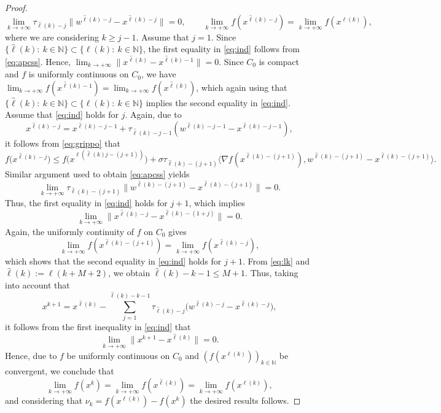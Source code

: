 \begin{proof}
	\begin{equation}\label{eq:ind}
		\lim_{k\to +\infty}  \tau_{{\hat \ell}(k)-j}\|w^{{{\hat \ell}(k)}-j}-x^{{{\hat \ell}(k)}-j}\|=0, \qquad \lim_{k\to +\infty} f(x^{{\hat \ell}(k)-j})= \lim_{k\to +\infty} f(x^{\ell(k)}),
	\end{equation}
	where we are  considering $k\geq j-1$. Assume that $j=1$. Since  $\{{\hat \ell}(k): ~k\in\mathbb{N}\}\subset \{{\ell}(k): ~k\in\mathbb{N}\}$, the first equality in \eqref{eq:ind} follows from \eqref{eq:apcss}. Hence, $\lim_{k\to +\infty} \|x^{{{\hat \ell}(k)}}-x^{{\hat \ell(k)}-1}\|=0$. Since  $C_{0}$ is  compact and  $f$ is uniformly continuous on $C_{0}$, we have $  \lim_{k\to +\infty} f(x^{{\hat \ell}(k)-1})=\lim_{k\to +\infty} f(x^{{\hat \ell(k)}})$, which again using that $\{{\hat \ell}(k): ~k\in\mathbb{N}\}\subset \{{\ell}(k): ~k\in\mathbb{N}\}$ implies the second equality in \eqref{eq:ind}. Assume that \eqref{eq:ind} holds for $j$. Again, due to
	$$x^{{{\hat \ell}(k)}-j}=x^{{{{\hat \ell}(k)}-j}-1}+ \tau_{{{{\hat \ell}(k)}-j}-1} (w^{{{{\hat \ell}(k)}-j}-1} - x^{{{{\hat \ell}(k)}-j} -1}),$$
	it follows from \eqref{eq:grippo} that
	$$
		f\big(x^{{{\hat \ell}(k)}-j}\big)  \leq f\big(x^{\ell({{{{\hat \ell}(k)}j}-(j+1)})}\big)+ \sigma \tau_{{{{\hat \ell}(k)}}-(j+1)}\big\langle \nabla f(x^{{{{\hat \ell}(k)}}-(j+1)}), w^{{{{\hat \ell}(k)}}-(j+1)} - x^{{{{\hat \ell}(k)}}-(j+1)} \big\rangle.
	$$
	Similar argument used to obtain \eqref{eq:apcss} yields
	$$
		\lim_{k\to +\infty} \tau_{{{{\hat \ell}(k)}}-(j+1)}\|w^{{{{\hat \ell}(k)}}-(j+1)}-x^{{{{\hat \ell}(k)}}-(j+1)}\|=0.
	$$
	Thus,  the first equality in \eqref{eq:ind} holds for $j+1$, which  implies
	$$
		\lim_{k\to +\infty} \|x^{{{\hat \ell}(k)}-j}-x^{{{{\hat \ell}(k)}}-(1+j)}\|=0.
	$$
	Again, the   uniformly continuity of $f$ on $C_{0}$ gives
	$$
		\lim_{k\to +\infty} f(x^{{\hat \ell}(k)-(j+1)})=\lim_{k\to +\infty} f(x^{{\hat \ell}(k)-j}),
	$$
	which shows that the second equality in \eqref{eq:ind} holds for $j+1$. From  \eqref{eq:lk}  and ${\hat \ell}(k):=\ell(k+M+2)$, we obtain ${\hat \ell}(k)-k-1\leq M+1$. Thus,  taking into account that
	$$
		x^{k+1}=x^{{\hat \ell}(k)}- \sum_{j=1}^{{\hat \ell}(k)-k-1} \tau_{{\hat \ell}(k)-j} \big(w^{{\hat \ell}(k)-j} - x^{{\hat \ell}(k)-j}\big),
	$$
	it follows from the first inequality in \eqref{eq:ind} that
	$$
		\lim_{k\to +\infty} \|x^{k+1}-x^{{\hat \ell}(k)}\|=0.
	$$
	Hence, due to  $f$ be uniformly continuous on $C_{0}$ and $(f(x^{\ell(k)}))_{k\in\mathbb{N}}$  be convergent,  we conclude that
	$$ \lim_{k\to +\infty} f(x^{k})=\lim_{k\to +\infty} f(x^{{\hat \ell}(k)})= \lim_{k\to +\infty} f(x^{\ell(k)}),$$
	and  considering that $\nu_{k}= f(x^{\ell(k)})-f(x^k)$ the desired results follows.
\end{proof}
